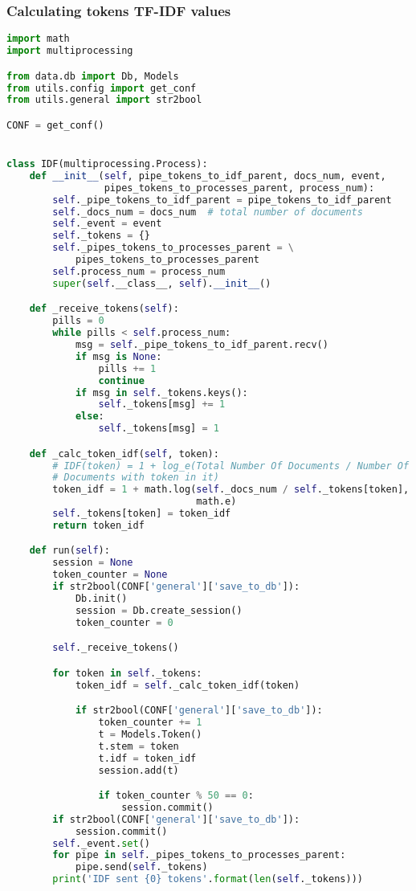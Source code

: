 \subsubsection{Calculating tokens TF-IDF values }
\begin{lstlisting}[language=Python, caption=IDF process]
import math
import multiprocessing

from data.db import Db, Models
from utils.config import get_conf
from utils.general import str2bool

CONF = get_conf()


class IDF(multiprocessing.Process):
    def __init__(self, pipe_tokens_to_idf_parent, docs_num, event,
                 pipes_tokens_to_processes_parent, process_num):
        self._pipe_tokens_to_idf_parent = pipe_tokens_to_idf_parent
        self._docs_num = docs_num  # total number of documents
        self._event = event
        self._tokens = {}
        self._pipes_tokens_to_processes_parent = \
            pipes_tokens_to_processes_parent
        self.process_num = process_num
        super(self.__class__, self).__init__()

    def _receive_tokens(self):
        pills = 0
        while pills < self.process_num:
            msg = self._pipe_tokens_to_idf_parent.recv()
            if msg is None:
                pills += 1
                continue
            if msg in self._tokens.keys():
                self._tokens[msg] += 1
            else:
                self._tokens[msg] = 1

    def _calc_token_idf(self, token):
        # IDF(token) = 1 + log_e(Total Number Of Documents / Number Of
        # Documents with token in it)
        token_idf = 1 + math.log(self._docs_num / self._tokens[token],
                                 math.e)
        self._tokens[token] = token_idf
        return token_idf

    def run(self):
        session = None
        token_counter = None
        if str2bool(CONF['general']['save_to_db']):
            Db.init()
            session = Db.create_session()
            token_counter = 0

        self._receive_tokens()

        for token in self._tokens:
            token_idf = self._calc_token_idf(token)

            if str2bool(CONF['general']['save_to_db']):
                token_counter += 1
                t = Models.Token()
                t.stem = token
                t.idf = token_idf
                session.add(t)

                if token_counter % 50 == 0:
                    session.commit()
        if str2bool(CONF['general']['save_to_db']):
            session.commit()
        self._event.set()
        for pipe in self._pipes_tokens_to_processes_parent:
            pipe.send(self._tokens)
        print('IDF sent {0} tokens'.format(len(self._tokens)))

\end{lstlisting}

